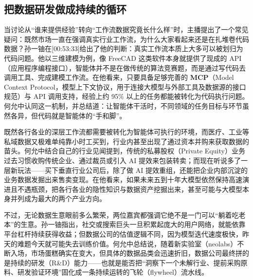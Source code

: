 \documentclass[UTF8,a4paper,11pt,fontset=fandol]{ctexart}
\begin{document}
\subsection{把数据研发做成持续的循环}
当讨论从“谁来提供经验”转向“工作流数据究竟长什么样”时，主播提出了一个常见疑问：既然市场一直在强调真实行业工作流，为什么大家看起来还是在扎堆卷代码数据？孙一铀在[00:53:33]给出了他的判断：真实工作流本质上大多可以被划归为代码问题。他以三维建模为例，像 FreeCAD 这类软件本身就提供了现成的 API（应用程序编程接口），智能体并不是在做传统的算法竞赛题，而是通过写代码去调用工具、完成建模工作流。在他看来，只要具备足够完善的 \textbf{MCP}（Model Context Protocol，模型上下文协议，用于连接大模型与外部工具及数据源的接口规范）与 API 调用支持，经验上约 95\% 以上的任务都能被转化为代码执行问题。何允中认同这一机制，并总结道：让智能体干活时，不同领域的任务目标与环节虽然各异，但代码就是智能体的“手和脚”。

既然各行各业的深层工作流都需要被转化为智能体可执行的环境，而医疗、工业等私域数据又极难单纯靠小时工买到，行业内甚至出现了通过资本并购来获取数据的苗头。何允中结合自己的行业见闻提到，传统的私募股权（Private Equity）业务过去习惯收购传统企业、通过裁员或引入 AI 提效来包装转卖；而现在听说多了一层新玩法——买下垂直行业公司后，除了做 AI 提效重组，还能把企业内部沉淀的业务数据发掘出来售卖变现。在他看来，如果未来五到十年大模型依然保持高速演进且不遇瓶颈，把各行各业的隐性知识与数据资产挖掘出来，甚至可能与大模型本身并列成为最大的两个产业方向。

不过，无论数据生意眼前多么繁荣，两位嘉宾都强调它绝不是一门可以“躺着吃老本”的生意。孙一铀指出，社交或搜索巨头一旦积累起庞大的用户网络，就能依靠平台杠杆持续获得收益；但数据公司的估值逻辑不同，因为模型迭代速度极快，昨天的难题今天就可能失去训练价值。何允中总结说，随着新实验室（neolabs）不断入场，市场蛋糕确实在变大，但具体的数据品类会迅速折旧，数据公司最终拼的是持续的研发（R\&D）能力——也就是能否把“洞察下一个未解行业、提前采购原料、研发验证环境”固化成一条持续运转的飞轮（flywheel）流水线。
\end{document}
